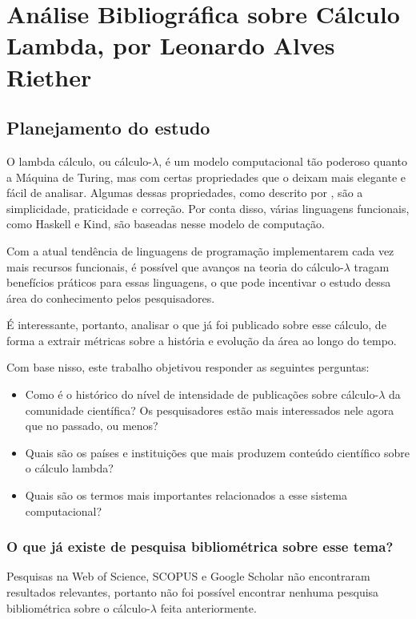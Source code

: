 \chapter{Análise Bibliográfica sobre Cálculo Lambda, por Leonardo Alves Riether\label{chap:bibliometria:LeoRiether}}

\section{Planejamento do estudo}
O lambda cálculo, ou cálculo-$\lambda$, é um modelo computacional tão poderoso quanto a Máquina de Turing, mas com certas propriedades que o deixam mais elegante e fácil de analisar. Algumas dessas propriedades, como descrito por \citet{lynn_lambda_nodate}, são a simplicidade, praticidade e correção. Por conta disso, várias linguagens funcionais, como Haskell e Kind\citep{kindelia_kind_nodate}, são baseadas nesse modelo de computação.

Com a atual tendência de linguagens de programação implementarem cada vez mais recursos funcionais, é possível que avanços na teoria do cálculo-$\lambda$ tragam benefícios práticos para essas linguagens, o que pode incentivar o estudo dessa área do conhecimento pelos pesquisadores.

É interessante, portanto, analisar o que já foi publicado sobre esse cálculo, de forma a extrair métricas sobre a história e evolução da área ao longo do tempo.

Com base nisso, este trabalho objetivou responder as seguintes perguntas:
\begin{itemize}
    \item Como é o histórico do nível de intensidade de publicações sobre cálculo-$\lambda$ da comunidade científica? Os pesquisadores estão mais interessados nele agora que no passado, ou menos? 
    \item Quais são os países e instituições que mais produzem conteúdo científico sobre o cálculo lambda? 
    \item Quais são os termos mais importantes relacionados a esse sistema computacional?
\end{itemize}

\subsection{O que já existe de pesquisa bibliométrica sobre esse tema?}
Pesquisas na Web of Science, SCOPUS e Google Scholar não encontraram resultados relevantes, portanto não foi possível encontrar nenhuma pesquisa bibliométrica sobre o cálculo-$\lambda$ feita anteriormente.

